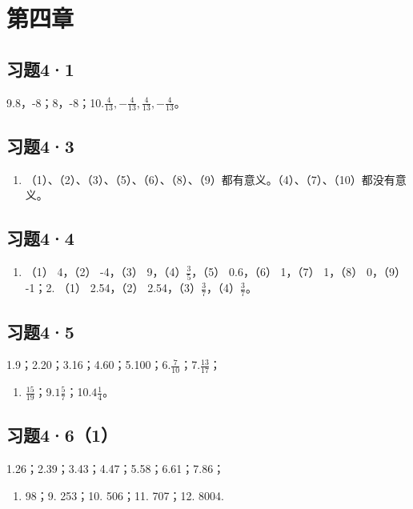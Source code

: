 \section{第四章}

\subsection{习题4·1}

9.8，-8；8，-8；10.\(\frac{4}{13}, -\frac{4}{13}, \frac{4}{13}, -\frac{4}{13}\)。

\subsection{习题4·3}

\begin{enumerate}
\item
  （1）、（2）、（3）、（5）、（6）、（8）、（9）都有意义。（4）、（7）、（10）都没有意义。
\end{enumerate}

\subsection{习题4·4}

\begin{enumerate}
\item
  （1） 4，（2） -4，（3） 9，（4）\(\frac{3}{5}\)，（5） 0.6，（6）
  1，（7） 1，（8） 0，（9） -1；2. （1） 2.54，（2）
  2.54，（3）\(\frac{3}{7}\)，（4）\(\frac{3}{7}\)。
\end{enumerate}

\subsection{习题4·5}

1.9；2.20；3.16；4.60；5.100；6.\(\frac{7}{10}\)；7.\(\frac{13}{17}\)；

\begin{enumerate}[start=8]
\item
  \(\frac{15}{19}\)；9.\(1\frac{5}{7}\)；10.\(4\frac{1}{4}\)。
\end{enumerate}

\subsection{习题4·6（1）}

1.26；2.39；3.43；4.47；5.58；6.61；7.86；

\begin{enumerate}[start=8]
\item
  98；9. 253；10. 506；11. 707；12. 8004.
\end{enumerate}

